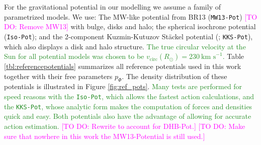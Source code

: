 \documentclass[iop,revtex4]{emulateapj}
\newcommand{\NEW}[1]{\textcolor{ForestGreen}{#1}}
\newcommand{\Wilma}[1]{\textcolor{Magenta}{#1}}
\begin{document}
For the gravitational potential in our modelling we assume a family of parametrized models. We use: The MW-like potential from BR13 (\texttt{MW13-Pot}) \Wilma{[TO DO: Remove MW13]} with bulge, disks and halo; the spherical isochrone potential (\texttt{Iso-Pot}); and the 2-component Kuzmin-Kutuzov St\"{a}ckel potential (\citealt{1994AA...287...43B}; \texttt{KKS-Pot}), which also displays a disk and halo structure. \NEW{The true circular velocity at the Sun for all potential models was chosen to be $v_\text{circ}(R_\odot)=230~\text{km s}^{-1}$.} Table \ref{tbl:referencepotentials} summarizes all reference potentials used in this work together with their free parameters $p_\Phi$. The density distribution of these potentials is illustrated in Figure \ref{fig:ref_pots}. \NEW{Many tests are performed for speed reasons with the \texttt{Iso-Pot}, which allows the fastest action calculations, and the \texttt{KKS-Pot}, whose analytic form makes the computation of forces and densities quick and easy. Both potentials also have the advantage of allowing for accurate action estimation.}
\Wilma{[TO DO: Rewrite to account for DHB-Pot.]}
\Wilma{[TO DO: Make sure that nowhere in this work the MW13-Potential is still used.]}
\end{document}
